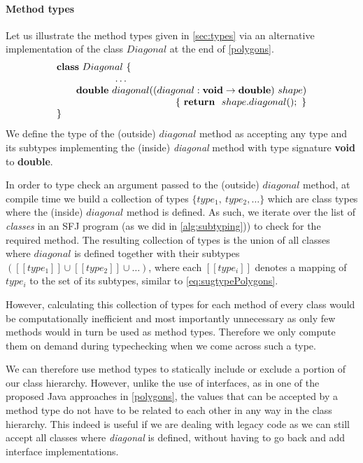 \documentclass[runningheads]{llncs}
\begin{document}
\paragraph{Method types}
Let us illustrate the method types given in \autoref{sec:types} via an alternative implementation of the class $Diagonal$ at the end of \autoref{polygons}.
$$
\begin{array}{l}
    \synclass Diagonal \ \{
    \\
    \qquad\qquad\qquad \ldots \\
    \qquad \textbf{double}\ diagonal((diagonal: \textbf{void} \rightarrow \textbf{double})\ shape)\\
    \hfill
    \{\ \synret\ shape.diagonal();\ \}
    \\
    \}
\end{array}
$$
We define the type of the (outside) $diagonal$ method as accepting any type and its subtypes implementing the (inside) \emph{diagonal} method with type signature \textbf{void} to \textbf{double}.

In order to type check an argument passed to the (outside) $diagonal$ method, at compile time we build a collection of types $\{type_{1},\ type_{2},\ldots\}$ which are class types where the (inside) $diagonal$ method is defined.
As such, we iterate over the list of \emph{classes} in an SFJ program (as we did in \autoref{alg:subtyping})) to check for the required method.
The resulting collection of types is the union of all classes where $diagonal$ is defined together with their subtypes $([\![type_{1}]\!] \cup [\![type_{2}]\!] \cup \ldots)$, where each $[\![type_{i}]\!]$ denotes a mapping of $type_i$ to the set of its subtypes, similar to \autoref{eq:sugtypePolygons}.

However, calculating this collection of types for each method of every class would be computationally inefficient and most importantly unnecessary as only few methods would in turn be used as method types.
Therefore we only compute them on demand during typechecking when we come across such a type.

We can therefore use method types to statically include or exclude a portion of our class hierarchy.
However, unlike the use of interfaces, as in one of the proposed Java approaches in \autoref{polygons}, the values that can be accepted by a method type do not have to be related to each other in any way in the class hierarchy.
This indeed is useful if we are dealing with legacy code as we can still accept all classes where \emph{diagonal} is defined, without having to go back and add interface implementations.
\end{document}
